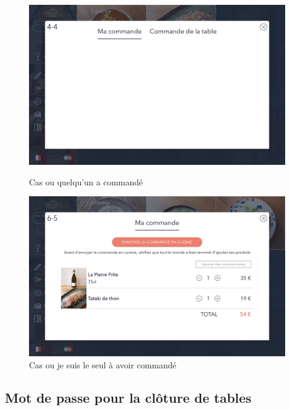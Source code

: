 \begin{figure}[!htb]
  \centering
  \begin{minipage}[b]{0.45\textwidth}
    \includegraphics[width=\textwidth]{images/selection4.png}
    \caption{Cas ou quelqu'un a commandé}
  \end{minipage}
  \hfill
  \begin{minipage}[b]{0.45\textwidth}
    \includegraphics[width=\textwidth]{images/selection5.png}
    \caption{Cas ou je suis le seul à avoir commandé}
  \end{minipage}
\end{figure}



\subsection{Mot de passe pour la clôture de tables}

